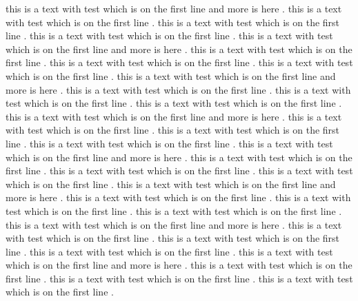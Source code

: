 this is a text with test \cite{line1} which is on the first line \cite{line11,line111} and more is here \cite{line3,line33,line333,line3333}.
this is a text with test \cite{coffee3} which is on the first line \cite{coffee33,coffee333}.
this is a text with test \cite{dogger1} which is on the first line \cite{dogger11,dogger111}.
this is a text with test \cite{mega2} which is on the first line \cite{mega22,mega222}.
this is a text with test \cite{line1} which is on the first line \cite{line11,line111} and more is here \cite{line3,line33,line333,line3333}.
this is a text with test \cite{coffee3} which is on the first line \cite{coffee33,coffee333}.
this is a text with test \cite{dogger1} which is on the first line \cite{dogger11,dogger111}.
this is a text with test \cite{mega2} which is on the first line \cite{mega22,mega222}.
this is a text with test \cite{line1} which is on the first line \cite{line11,line111} and more is here \cite{line3,line33,line333,line3333}.
this is a text with test \cite{coffee3} which is on the first line \cite{coffee33,coffee333}.
this is a text with test \cite{dogger1} which is on the first line \cite{dogger11,dogger111}.
this is a text with test \cite{mega2} which is on the first line \cite{mega22,mega222}.
this is a text with test \cite{line1} which is on the first line \cite{line11,line111} and more is here \cite{line3,line33,line333,line3333}.
this is a text with test \cite{coffee3} which is on the first line \cite{coffee33,coffee333}.
this is a text with test \cite{dogger1} which is on the first line \cite{dogger11,dogger111}.
this is a text with test \cite{mega2} which is on the first line \cite{mega22,mega222}.
this is a text with test \cite{line1} which is on the first line \cite{line11,line111} and more is here \cite{line3,line33,line333,line3333}.
this is a text with test \cite{coffee3} which is on the first line \cite{coffee33,coffee333}.
this is a text with test \cite{dogger1} which is on the first line \cite{dogger11,dogger111}.
this is a text with test \cite{mega2} which is on the first line \cite{mega22,mega222}.
this is a text with test \cite{line1} which is on the first line \cite{line11,line111} and more is here \cite{line3,line33,line333,line3333}.
this is a text with test \cite{coffee3} which is on the first line \cite{coffee33,coffee333}.
this is a text with test \cite{dogger1} which is on the first line \cite{dogger11,dogger111}.
this is a text with test \cite{mega2} which is on the first line \cite{mega22,mega222}.
this is a text with test \cite{line1} which is on the first line \cite{line11,line111} and more is here \cite{line3,line33,line333,line3333}.
this is a text with test \cite{coffee3} which is on the first line \cite{coffee33,coffee333}.
this is a text with test \cite{dogger1} which is on the first line \cite{dogger11,dogger111}.
this is a text with test \cite{mega2} which is on the first line \cite{mega22,mega222}.
this is a text with test \cite{line1} which is on the first line \cite{line11,line111} and more is here \cite{line3,line33,line333,line3333}.
this is a text with test \cite{coffee3} which is on the first line \cite{coffee33,coffee333}.
this is a text with test \cite{dogger1} which is on the first line \cite{dogger11,dogger111}.
this is a text with test \cite{mega2} which is on the first line \cite{mega22,mega222}.